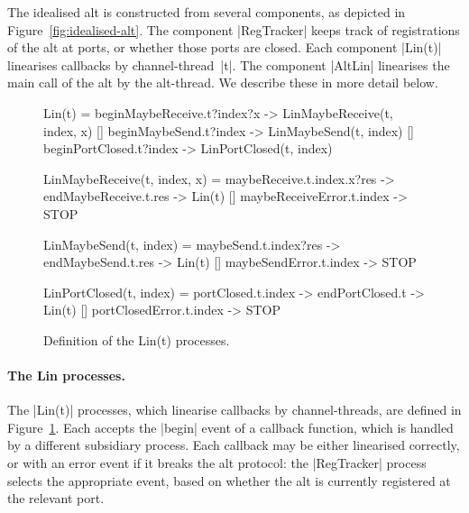 The idealised alt is constructed from several components, as depicted in
Figure~\ref{fig:idealised-alt}.  The component |RegTracker| keeps track of
registrations of the alt at ports, or whether those ports are closed.  Each
component |Lin(t)| linearises callbacks by channel-thread~|t|.  The component
|AltLin| linearises the main call of the alt by the alt-thread.  We describe
these in more detail below.


\begin{figure}
\begin{cspm}
Lin(t) = 
  beginMaybeReceive.t?index?x -> LinMaybeReceive(t, index, x)
  [] beginMaybeSend.t?index -> LinMaybeSend(t, index)
  [] beginPortClosed.t?index -> LinPortClosed(t, index)
  
LinMaybeReceive(t, index, x) = 
  maybeReceive.t.index.x?res -> endMaybeReceive.t.res -> Lin(t)
  [] maybeReceiveError.t.index -> STOP
  
LinMaybeSend(t, index) = 
  maybeSend.t.index?res -> endMaybeSend.t.res -> Lin(t)
  [] maybeSendError.t.index -> STOP
  
LinPortClosed(t, index) = 
  portClosed.t.index -> endPortClosed.t -> Lin(t)
  [] portClosedError.t.index -> STOP
\end{cspm}
\caption{Definition of the {\scalastyle Lin(t)}
  processes.  \label{fig:alt-lin}} 
\end{figure}


\paragraph{The {\scalastyle Lin} processes.}

The |Lin(t)| processes, which linearise callbacks by channel-threads, are
defined in Figure~\ref{fig:alt-lin}.  Each accepts the |begin| event of a
callback function, which is handled by a different subsidiary process.  Each
callback may be either linearised correctly, or with an error event if it
breaks the alt protocol: the |RegTracker| process selects the appropriate
event, based on whether the alt is currently registered at the relevant port.


